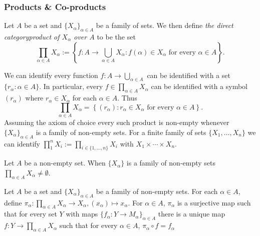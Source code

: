 \subsubsection{Products \& Co-products}
\begin{definition}
    Let $A$ be a set and $\{X_\alpha\}_{\alpha\in A}$ be a family of sets. We then define \textit{the direct categoryproduct of $X_\alpha$ over $A$} to be the set
    $$\prod_{\alpha\in A} X_\alpha := \left\{ f: A \rightarrow \bigcup_{\alpha \in A} X_\alpha : f(\alpha) \in X_\alpha \text{ for every } \alpha\in A\right\}.$$
\end{definition}
\begin{remark}
    We can identify every function $f : A \rightarrow \bigcup_{\alpha\in A}$ can be identified with a set $\{r_\alpha : \alpha\in A\}$. In particular, every $f\in \prod_{\alpha\in A} X_\alpha$ can be identified with a symbol $(r_\alpha)$ where $r_\alpha\in X_\alpha$ for each $\alpha\in A$. Thus 
    $$\prod_{\alpha\in A} X_\alpha = \left\{ (r_\alpha) : r_\alpha\in X_\alpha \text{ for every } \alpha\in A\right\}.$$
    Assuming the axiom of choice every such product is non-empty whenever $\{X_\alpha\}_{\alpha\in A}$ is a family of non-empty sets. For a finite family of sets $\{X_1,\dots,X_n\}$ we can identify $\prod_1^n X_i := \prod_{i\in \{1,\dots,n\}} X_i$ with $X_1\times \cdots \times X_n$.  
\end{remark}
\begin{axioms}
    Let $A$ be a non-empty set. When $\{X_\alpha\}$ is a family of non-empty sets $\prod_{\alpha \in A} X_\alpha \neq \emptyset$. 
\end{axioms}
\begin{proposition}\label{DirectProductIsADirectProductInTheCategoryOfSets}
    Let $A$ be a set and $\{X_\alpha\}_{\alpha\in A}$ be a family of non-empty sets. For each $\alpha\in A$, define $\pi_\alpha : \prod_{\alpha\in A} X_\alpha \rightarrow X_\alpha, (x_\alpha)\mapsto x_\alpha$. For $\alpha\in A$, $\pi_\alpha$ is a surjective map such that for every set $Y$ with maps $\{f_\alpha : Y \rightarrow M_\alpha\}_{\alpha\in A} $ there is a unique map $f : Y \rightarrow \prod_{\alpha \in A} X_\alpha$ such that for every $\alpha \in A$, $\pi_\alpha \circ f = f_\alpha$   
\end{proposition}
